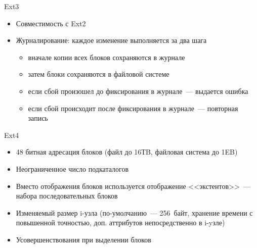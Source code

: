 \documentclass[aspectratio=169,14pt]{beamer}
\begin{document}
\begin{frame}{Ext3}
    \begin{itemize}
        \item Совместимость с Ext2
        \item Журналирование: каждое изменение выполняется за два шага
        \begin{itemize}
            \item вначале копии всех блоков сохраняются в журнале
            \item затем блоки сохраняются в файловой системе
            \item если сбой произошел до фиксирования в журнале~--- выдается ошибка
            \item если сбой происходит после фиксирования в журнале~--- повторная запись
        \end{itemize}
    \end{itemize}
\end{frame}

\begin{frame}{Ext4}
    \begin{itemize}
        \item 48 битная адресация блоков (файл до 16ТB, файловая система до 1EB)
        \item Неограниченное число подкаталогов
        \item Вместо отображения блоков используется отображение <<экстентов>>~---
        набора последовательных блоков
        \item Изменяемый размер i-узла (по-умолчанию~--- 256~байт, хранение
        времени с повышенной точностью, доп. аттрибутов непосредственно в i-yзле)
        \item Усовершенствования при выделении блоков
    \end{itemize}

\end{frame}
\end{document}
